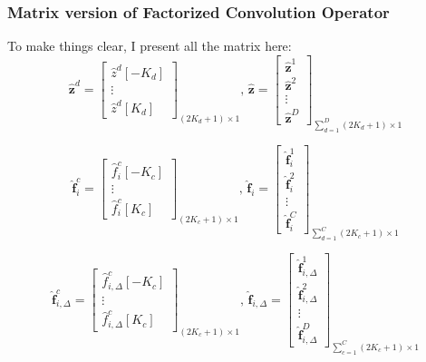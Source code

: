 \documentclass[12pt]{article}
\numberwithin{equation}{section}
\begin{document}
{\subsubsection{Matrix version of Factorized Convolution Operator}
To make things clear, I present all the matrix here: 
\begin{equation}
	\hat{\bm{z}}^d= 
	\begin{bmatrix}
		\hat{z}^d[-K_d] \\  \vdots \\ \hat{z}^d[K_d] 
	\end{bmatrix}_{(2K_d+1) \times 1}
	\text{,   }
	\hat{\bm{z}}= 
	\begin{bmatrix}
		\hat{\bm{z}}^1 \\ \hat{\bm{z}}^2 \\ \vdots \\ \hat{\bm{z}}^D
	\end{bmatrix}_{\sum^{D}_{d=1}(2K_d+1) \times 1}
\end{equation} \par
\begin{equation}
	\hat{\bm{f}}_i^c= 
	\begin{bmatrix}
		\hat{f}^c_i[-K_c] \\  \vdots \\ \hat{f}^c_i[K_c] 
	\end{bmatrix}_{(2K_c+1) \times 1}
	\text{,   }
	\hat{\bm{f}}_i= 
	\begin{bmatrix}
		\hat{\bm{f}}^1_i \\ \hat{\bm{f}}^2_i \\ \vdots \\ \hat{\bm{f}}^C_i
	\end{bmatrix}_{\sum^{C}_{d=1}(2K_c+1) \times 1}
\end{equation} \par
\begin{equation}
	\hat{\bm{f}}_{i, \Delta}^c= 
	\begin{bmatrix}
		\hat{f}^c_{i, \Delta}[-K_c] \\  \vdots \\ \hat{f}^c_{i, \Delta}[K_c] 
	\end{bmatrix}_{(2K_c+1) \times 1}
	 \text{,   }
	\hat{\bm{f}}_{i, \Delta}= 
	\begin{bmatrix}
		\hat{\bm{f}}^1_{i, \Delta} \\ \hat{\bm{f}}^2_{i, \Delta} \\ \vdots \\ \hat{\bm{f}}^D_{i, \Delta}
	\end{bmatrix}_{\sum^{C}_{c=1}(2K_c+1) \times 1}	

\end{equation}}
\end{document}
